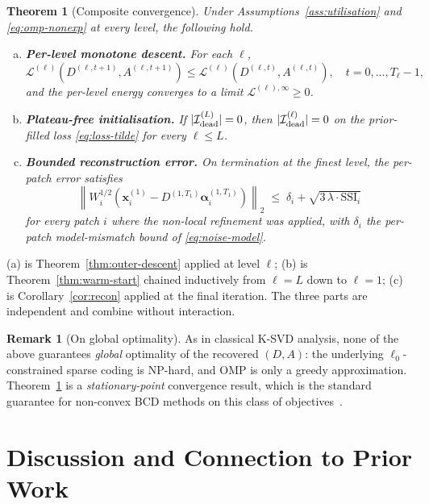 \documentclass[journal,onecolumn,11pt]{IEEEtran}
\newtheorem{theorem}{Theorem}
\theoremstyle{definition}
\newtheorem{remark}{Remark}
\newcommand{\Loss}{\mathcal{L}}
\newcommand{\norm}[1]{\left\lVert #1 \right\rVert}
\newcommand{\xvec}{\bm{x}}
\newcommand{\alphavec}{\bm{\alpha}}
\begin{document}
\begin{theorem}[Composite convergence]
\label{thm:composite}
Under Assumptions~\ref{ass:utilisation} and \eqref{eq:omp-nonexp} at every
level, the following hold.
\begin{enumerate}[(a)]
\item \textbf{Per-level monotone descent.} For each $\ell$,
\[
\Loss^{(\ell)}(D^{(\ell,t+1)},A^{(\ell,t+1)})
\le \Loss^{(\ell)}(D^{(\ell,t)},A^{(\ell,t)}),
\quad t=0,\dots,T_\ell-1,
\]
and the per-level energy converges to a limit
$\Loss^{(\ell),\infty}\ge 0$.
\item \textbf{Plateau-free initialisation.} If
$|\mathcal{I}_{\rm dead}^{(L)}|=0$, then $|\mathcal{I}_{\rm dead}^{(\ell)}|=0$
on the prior-filled loss \eqref{eq:loss-tilde} for every $\ell\le L$.
\item \textbf{Bounded reconstruction error.} On termination at the finest
level, the per-patch error satisfies
\[
\norm{W_i^{1/2}(\xvec_i^{(1)}-D^{(1,T_1)}\alphavec_i^{(1,T_1)})}_2
\;\le\;\delta_i+\sqrt{3\,\lambda\cdot\mathrm{SSI}_i}
\]
for every patch $i$ where the non-local refinement was applied,
with $\delta_i$ the per-patch model-mismatch bound of
\eqref{eq:noise-model}.
\end{enumerate}
\end{theorem}
\begin{IEEEproof}
(a) is Theorem~\ref{thm:outer-descent} applied at level $\ell$; (b) is
Theorem~\ref{thm:warm-start} chained inductively from $\ell=L$ down to
$\ell=1$; (c) is Corollary~\ref{cor:recon} applied at the final
iteration. The three parts are independent and combine without
interaction.
\end{IEEEproof}

\begin{remark}[On global optimality]
As in classical K-SVD analysis, none of the above guarantees \emph{global}
optimality of the recovered $(D,A)$: the underlying $\ell_0$-constrained
sparse coding is NP-hard, and OMP is only a greedy approximation.
Theorem~\ref{thm:composite} is a \emph{stationary-point} convergence result,
which is the standard guarantee for non-convex BCD methods on this class
of objectives~\cite{tseng2001convergence,aharon2006ksvd}.
\end{remark}

\section{Discussion and Connection to Prior Work}
\end{document}
